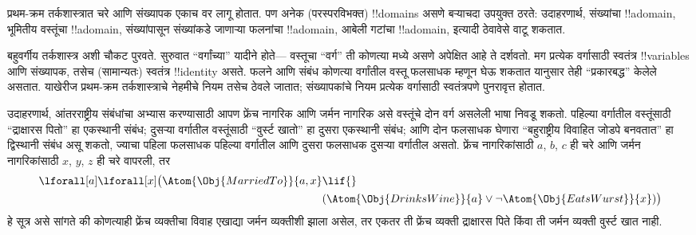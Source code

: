 \documentclass[../../../include/open-logic-section]{subfiles}
\begin{document}


प्रथम-क्रम तर्कशास्त्रात चरे आणि संख्यापक एकाच वर लागू होतात.
पण अनेक (परस्परविभक्त) !!{domain}s असणे बऱ्याचदा उपयुक्त ठरते: उदाहरणार्थ,
संख्यांचा !!a{domain}, भूमितीय वस्तूंचा !!a{domain}, संख्यांपासून संख्यांकडे
जाणाऱ्या फलनांचा !!a{domain}, आबेली गटांचा !!a{domain}, इत्यादी ठेवावेसे वाटू
शकतात.

बहुवर्गीय तर्कशास्त्र अशी चौकट पुरवते. सुरुवात ``वर्गांच्या'' यादीने होते---
वस्तूचा ``वर्ग'' ती कोणत्या मध्ये असणे अपेक्षित आहे ते दर्शवतो.
मग प्रत्येक वर्गासाठी स्वतंत्र !!{variable}s आणि संख्यापक, तसेच (सामान्यतः)
स्वतंत्र !!{identity} असते. फलने आणि संबंध कोणत्या वर्गांतील वस्तू फलसाधक
म्हणून घेऊ शकतात यानुसार तेही ``प्रकारबद्ध'' केलेले असतात. याखेरीज
प्रथम-क्रम तर्कशास्त्राचे नेहमीचे नियम तसेच ठेवले जातात; संख्यापकांचे नियम
प्रत्येक वर्गासाठी स्वतंत्रपणे पुनरावृत्त होतात.

उदाहरणार्थ, आंतरराष्ट्रीय संबंधांचा अभ्यास करण्यासाठी आपण फ्रेंच नागरिक आणि
जर्मन नागरिक असे वस्तूंचे दोन वर्ग असलेली भाषा निवडू शकतो. पहिल्या वर्गातील
वस्तूंसाठी ``द्राक्षारस पितो'' हा एकस्थानी संबंध; दुसऱ्या वर्गातील वस्तूंसाठी
``वुर्स्ट खातो'' हा दुसरा एकस्थानी संबंध; आणि दोन फलसाधक घेणारा ``बहुराष्ट्रीय
विवाहित जोडपे बनवतात'' हा द्विस्थानी संबंध असू शकतो, ज्याचा पहिला फलसाधक
पहिल्या वर्गातील आणि दुसरा फलसाधक दुसऱ्या वर्गातील असतो. फ्रेंच नागरिकांसाठी
$a$, $b$, $c$ ही चरे आणि जर्मन नागरिकांसाठी $x$, $y$, $z$ ही चरे वापरली, तर
\[
\begin{aligned}
\lforall[a]\lforall[x]\bigl(\Atom{\Obj{MarriedTo}}{a,x} &{}\lif{}\\
 & (\Atom{\Obj{DrinksWine}}{a} \lor \lnot \Atom{\Obj{EatsWurst}}{x})\bigr)
\end{aligned}
\]
हे सूत्र असे सांगते की कोणत्याही फ्रेंच व्यक्तीचा विवाह एखाद्या जर्मन
व्यक्तीशी झाला असेल, तर एकतर ती फ्रेंच व्यक्ती द्राक्षारस पिते किंवा ती जर्मन
व्यक्ती वुर्स्ट खात नाही.
\end{document}
